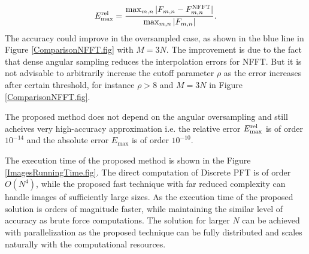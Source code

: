 \documentclass{UCF_ETD}
\begin{document}
{ \begin{eqnarray} \label{RelativeError}
 E^{\rm rel}_{\max} = \frac{\max_{m,n}| F_{m,n}-F^{\rm NFFT}_{m,n} |}{\max_{m,n}| F_{m,n}| }.
 \end{eqnarray}
 The accuracy could improve in the oversampled case, as shown in the blue line in Figure \ref{ComparisonNFFT.fig} with $M = 3N$. The improvement is due to the fact that dense angular sampling reduces the interpolation errors for NFFT. But it is not advisable to arbitrarily increase the cutoff parameter $\rho$ as the error increases after certain threshold, for instance $\rho > 8$ and $M=3N$ in Figure \ref{ComparisonNFFT.fig}.
 
 
 The proposed method does not depend on the angular oversampling and still acheives very high-accuracy approximation i.e. the relative error $E^{\rm rel}_{\max}$ is of order $10^{-14}$ and the absolute error $E_{\max}$ is of order $10^{-10}$.
 }
 
 
  The execution time of the proposed method is shown in the Figure \ref{ImagesRunningTime.fig}. The direct computation of Discrete PFT is of order $O(N^4)$, while the proposed fast technique with far reduced complexity can handle images of sufficiently large sizes.  As %
  the execution time of the proposed solution is orders
 of magnitude faster, while maintaining the similar level of accuracy as brute
 force computations. The solution for larger $N$
 can be achieved with parallelization as the proposed technique can be fully
 distributed and scales naturally with the computational resources.
 
 
\end{document}
